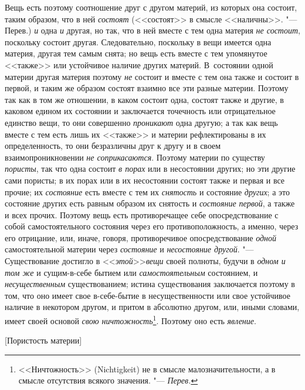 Вещь есть поэтому соотношение друг с другом материй, из которых она состоит,
таким образом, что в ней {\em состоят} (<<состоят>> в
смысле <<наличны>>. "--- Перев.) {\em и} одна
{\em и} другая, но так, что в ней вместе с тем одна
материя {\em не состоит}, поскольку состоит другая.
Следовательно, поскольку в вещи имеется одна материя, другая тем самым
снята; но вещь есть вместе с тем упомянутое <<также>> или устойчивое наличие
других материй. В~состоянии одной материи другая материя поэтому
{\em не} состоит и вместе с тем она также и состоит в
первой, и таким же образом состоят взаимно все эти разные материи. Поэтому
так как в том же отношении, в каком состоит одна, состоят также и другие, в
каковом едином их состоянии и заключается точечность или отрицательное
единство вещи, то они совершенно {\em проникают} одна
другую; а так как вещь вместе с тем есть лишь их <<также>> и материи
рефлектированы в их определенность, то они безразличны друг к другу и в
своем взаимопроникновении {\em не соприкасаются}.
Поэтому материи по существу {\em пористы}, так что одна
состоит {\em в порах} или в несостоянии других; но эти
другие сами пористы; в их порах или в их несостоянии состоят также и первая
и все прочие; их {\em состояние} есть вместе с тем их
{\em снятость} и состояние {\em других}; а это состояние других есть равным
образом их снятость и {\em состояние первой}, а также и
всех прочих. Поэтому вещь есть противоречащее себе опосредствование с собой
самостоятельного состояния через его противоположность, а именно, через его
отрицание, или, иначе, говоря, противоречивое опосредствование
{\em одной} самостоятельной материи через {\em состояние} и {\em несостояние
другой}. "--- Существование достигло в <<{\em этой}>>{\em вещи} своей
полноты, будучи в {\em одном и том же} и сущим-в-себе
бытием или {\em самостоятельным} состоянием, и
{\em несущественным} существованием; истина
существования заключается поэтому в том, что оно имеет свое в-себе-бытие в
несущественности или свое устойчивое наличие в некотором другом, и притом в
абсолютно другом, или, иными словами, имеет своей основой
{\em свою ничтожность}\footnote{<<Ничтожность>> (Nichtigkeit) не
в смысле малозначительности, а в смысле отсутствия всякого
значения. "--- {\em Перев.}}. Поэтому оно есть {\em явление}.

%
  {[Пористость материи]}

